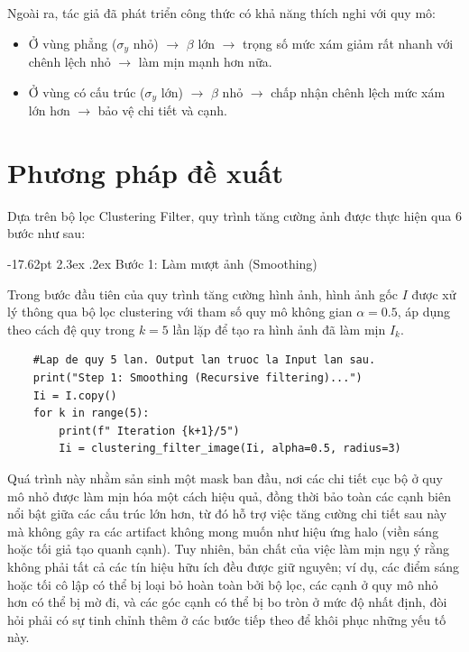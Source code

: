 \documentclass[a4paper]{report}
\makeatletter
\renewcommand\section{\@startsection{section}{1}{\z@}%
    {-17.62pt \@plus -5.89pt \@minus -1.18pt}%
    {2.3ex \@plus .2ex}%
    {\normalfont\fontsize{14.95pt}{16.31pt}\selectfont\bfseries}}%
\makeatother
\begin{document}
Ngoài ra, tác giả đã phát triển công thức có khả năng thích nghi với quy mô:

\begin{itemize}
    \item Ở vùng phẳng ($\sigma_y$ nhỏ) $\rightarrow$ $\beta$ lớn $\rightarrow$ trọng số mức xám giảm rất nhanh với
          chênh lệch nhỏ $\rightarrow$ làm mịn mạnh hơn nữa.
    \item Ở vùng có cấu trúc ($\sigma_y$ lớn) $\rightarrow$ $\beta$ nhỏ $\rightarrow$ chấp nhận chênh lệch mức xám lớn
          hơn $\rightarrow$ bảo vệ chi tiết và cạnh.
\end{itemize}

\chapter{Phương pháp đề xuất}

Dựa trên bộ lọc Clustering Filter, quy trình tăng cường ảnh được thực hiện qua 6
bước như sau:

\section{Bước 1: Làm mượt ảnh (Smoothing)}

Trong bước đầu tiên của quy trình tăng cường hình ảnh, hình ảnh gốc $I$ được xử
lý thông qua bộ lọc clustering với tham số quy mô không gian $\alpha = 0.5$, áp dụng
theo cách đệ quy trong $k = 5$ lần lặp để tạo ra hình ảnh đã làm mịn $I_k$.

\begin{lstlisting}
    #Lap de quy 5 lan. Output lan truoc la Input lan sau.
    print("Step 1: Smoothing (Recursive filtering)...")
    Ii = I.copy()
    for k in range(5):
        print(f" Iteration {k+1}/5")
        Ii = clustering_filter_image(Ii, alpha=0.5, radius=3)
\end{lstlisting}

Quá trình này nhằm sản sinh một mask ban đầu, nơi các chi tiết cục bộ ở quy mô
nhỏ được làm mịn hóa một cách hiệu quả, đồng thời bảo toàn các cạnh biên nổi
bật giữa các cấu trúc lớn hơn, từ đó hỗ trợ việc tăng cường chi tiết sau này mà
không gây ra các artifact không mong muốn như hiệu ứng halo (viền sáng hoặc tối
giả tạo quanh cạnh). Tuy nhiên, bản chất của việc làm mịn ngụ ý rằng không phải
tất cả các tín hiệu hữu ích đều được giữ nguyên; ví dụ, các điểm sáng hoặc tối cô
lập có thể bị loại bỏ hoàn toàn bởi bộ lọc, các cạnh ở quy mô nhỏ hơn có thể bị
mờ đi, và các góc cạnh có thể bị bo tròn ở mức độ nhất định, đòi hỏi phải có sự
tinh chỉnh thêm ở các bước tiếp theo để khôi phục những yếu tố này.
\end{document}
